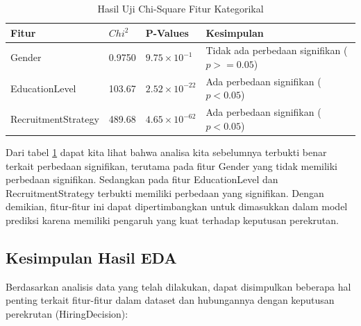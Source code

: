 \begin{table}[H]
    \centering
    \caption{Hasil Uji Chi-Square Fitur Kategorikal}
    \label{tb:chi-square}
    \begin{tabular}{|l|l|l|l|}
    \hline
    \rowcolor[HTML]{EFEFEF} 
    Fitur               & $Chi^{2}$    & P-Values     & Kesimpulan                     \\ \hline
    Gender              & 0.9750 & $9.75 \times 10^{-1}$ & Tidak ada perbedaan signifikan (\(p >= 0.05\)) \\ \hline
    EducationLevel      & 103.67 & $2.52 \times 10^{-22}$ & Ada perbedaan signifikan (\(p < 0.05\))       \\ \hline
    RecruitmentStrategy & 489.68 & $4.65 \times 10^{-62}$ & Ada perbedaan signifikan (\(p < 0.05\))      \\ \hline
    \end{tabular}
\end{table}

Dari tabel \ref{tb:chi-square} dapat kita lihat bahwa analisa kita sebelumnya terbukti benar terkait perbedaan signifikan, terutama pada fitur Gender yang tidak memiliki perbedaan signifikan. Sedangkan pada fitur EducationLevel dan RecruitmentStrategy terbukti memiliki perbedaan yang signifikan. Dengan demikian, fitur-fitur ini dapat dipertimbangkan untuk dimasukkan dalam model prediksi karena memiliki pengaruh yang kuat terhadap keputusan perekrutan.
\newpage
\subsection{Kesimpulan Hasil EDA}
Berdasarkan analisis data yang telah dilakukan, dapat disimpulkan beberapa hal penting terkait fitur-fitur dalam dataset dan hubungannya dengan keputusan perekrutan (HiringDecision):

